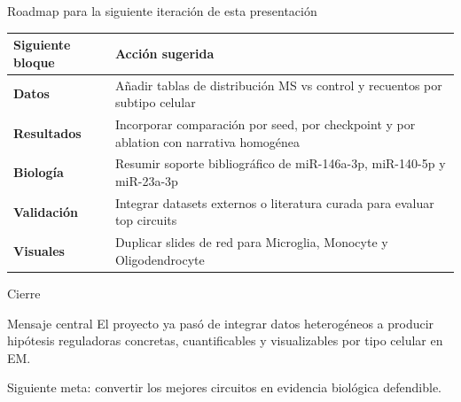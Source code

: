 \begin{frame}{Roadmap para la siguiente iteraci\'on de esta presentaci\'on}
  \small
  \begin{tabularx}{\textwidth}{>{\bfseries}p{3.2cm}X}
    \toprule
    Siguiente bloque & Acci\'on sugerida \\
    \midrule
    Datos & A\~nadir tablas de distribuci\'on MS vs control y recuentos por subtipo celular \\
    Resultados & Incorporar comparaci\'on por seed, por checkpoint y por ablation con narrativa homog\'enea \\
    Biolog\'ia & Resumir soporte bibliogr\'afico de miR-146a-3p, miR-140-5p y miR-23a-3p \\
    Validaci\'on & Integrar datasets externos o literatura curada para evaluar top circuits \\
    Visuales & Duplicar slides de red para Microglia, Monocyte y Oligodendrocyte \\
    \bottomrule
  \end{tabularx}
\end{frame}

\begin{frame}{Cierre}
  \begin{block}{Mensaje central}
    El proyecto ya pas\'o de integrar datos heterog\'eneos a producir hip\'otesis reguladoras concretas, cuantificables y visualizables por tipo celular en EM.
  \end{block}

  \vspace{0.8em}

  \centering
  \Large
  Siguiente meta: convertir los mejores circuitos en evidencia biol\'ogica defendible.
\end{frame}